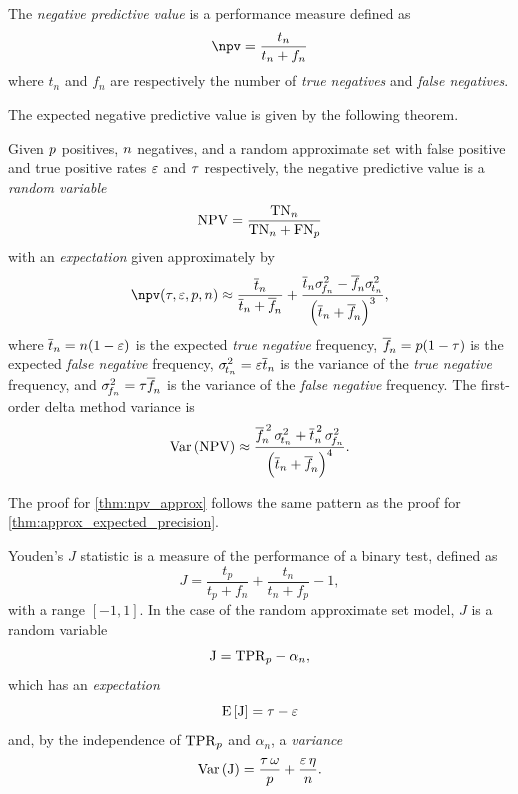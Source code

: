 \begin{definition}
	The \emph{negative predictive value} is a performance measure defined as
	\begin{equation}
	\npv = \frac{t_n}{t_n + f_n}
	\end{equation}
	where $t_n$ and $f_n$ are respectively the number of \emph{true negatives}
	and \emph{false negatives}.
\end{definition}
The expected negative predictive value is given by the following theorem.
\begin{theorem}
	\label{thm:npv_approx}
	Given $p$ positives, $n$ negatives, and a random approximate set with false positive and true positive rates $\varepsilon$ and $\tau$ respectively, the negative predictive value is a \emph{random variable}
	\begin{equation}
	\mathrm{NPV} = \frac{\mathrm{TN}_{n}}{\mathrm{TN}_{n} + \mathrm{FN}_{p}}
	\end{equation}
	with an \emph{expectation} given approximately by
	\begin{equation}
	\label{eq:npv_approx}
	\npv(\tprate, \fprate , \p, \n) \approx
	\frac{\overline{t}_n}{\overline{t}_n + \overline{f}_{\!n}} +
	\frac{\overline{t}_n \sigma_{\!f_n}^2 - \overline{f}_{\!n}
		\sigma_{\!t_n}^2}{\left(\overline{t}_n + \overline{f}_{\!n}\right)^3},
	\end{equation}
	where $\overline{t}_n = n(1-\varepsilon)$ is the expected \emph{true negative} frequency, $\overline{f}_{\!n} =  p(1-\tau)$ is the expected \emph{false negative} frequency, $\sigma_{\!t_n}^2 = \varepsilon \overline{t}_n$ is the variance of the \emph{true negative} frequency, and $\sigma_{\!f_n}^2 = \tau\overline{f}_{\!n}$ is the variance of the \emph{false negative} frequency.
	The first-order delta method variance is
	\begin{equation}
	\label{eq:var_npv}
	\Var{\NPV} \approx
	\frac{\overline{f}_{\!\n}^{\,2}\,\sigma_{\!t_\n}^2 +
		\overline{t}_\n^{\,2}\,\sigma_{\!f_\n}^2}
	{\left(\overline{t}_\n + \overline{f}_{\!\n}\right)^4}.
	\end{equation}
\end{theorem}
The proof for \cref{thm:npv_approx} follows the same pattern as the proof for \cref{thm:approx_expected_precision}.

Youden's $J$ statistic is a measure of the performance of a binary test, defined as
\begin{equation}
J = \frac{t_p}{t_p + f_n} + \frac{t_n}{t_n + f_p} - 1,
\end{equation}
with a range $[-1,1]$.
In the case of the random approximate set model, $J$ is a random variable
\begin{equation}
\mathrm{J} = \mathrm{TPR}_p - \alpha_n,
\end{equation}
which has an \emph{expectation}
\begin{equation}
\Expect{\RV{J}} = \tprate - \fprate
\end{equation}
and, by the independence of $\mathrm{TPR}_p$ and $\alpha_n$, a \emph{variance}
\begin{equation}
\label{eq:var_j}
\Var{\RV{J}} = \frac{\tprate\,\fnrate}{\p} + \frac{\fprate\,\tnrate}{\n}.
\end{equation}

